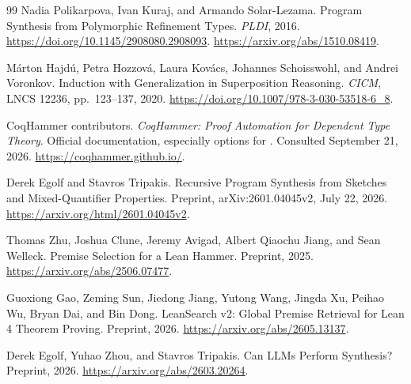 \begin{thebibliography}{99}
 Nadia Polikarpova, Ivan Kuraj, and Armando Solar-Lezama.
Program Synthesis from Polymorphic Refinement Types.
\emph{PLDI}, 2016.
\url{https://doi.org/10.1145/2908080.2908093}.
\url{https://arxiv.org/abs/1510.08419}.

 M{\'a}rton Hajd{\'u}, Petra Hozzov{\'a},
Laura Kov{\'a}cs, Johannes Schoisswohl, and Andrei Voronkov.
Induction with Generalization in Superposition Reasoning.
\emph{CICM}, LNCS 12236, pp.~123--137, 2020.
\url{https://doi.org/10.1007/978-3-030-53518-6_8}.

 CoqHammer contributors.
\emph{CoqHammer: Proof Automation for Dependent Type Theory}.
Official documentation, especially options for .
Consulted September 21, 2026.
\url{https://coqhammer.github.io/}.

 Derek Egolf and Stavros Tripakis.
Recursive Program Synthesis from Sketches and Mixed-Quantifier Properties.
Preprint, arXiv:2601.04045v2, July 22, 2026.
\url{https://arxiv.org/html/2601.04045v2}.

 Thomas Zhu, Joshua Clune, Jeremy Avigad,
Albert Qiaochu Jiang, and Sean Welleck.
Premise Selection for a Lean Hammer. Preprint, 2025.
\url{https://arxiv.org/abs/2506.07477}.

 Guoxiong Gao, Zeming Sun, Jiedong Jiang, Yutong Wang,
Jingda Xu, Peihao Wu, Bryan Dai, and Bin Dong.
LeanSearch v2: Global Premise Retrieval for Lean 4 Theorem Proving.
Preprint, 2026.
\url{https://arxiv.org/abs/2605.13137}.

 Derek Egolf, Yuhao Zhou, and Stavros Tripakis.
Can LLMs Perform Synthesis? Preprint, 2026.
\url{https://arxiv.org/abs/2603.20264}.

\end{thebibliography}
